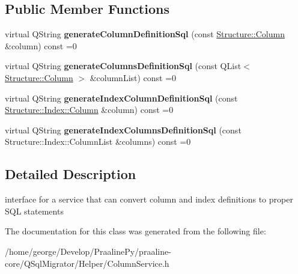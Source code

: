 \subsection*{Public Member Functions}
\begin{DoxyCompactItemize}
\item 
\mbox{\label{class_q_sql_migrator_1_1_helper_1_1_column_service_aa3adb01c524afc209a029a803f9ff177}} 
virtual Q\+String {\bfseries generate\+Column\+Definition\+Sql} (const \hyperlink{class_q_sql_migrator_1_1_structure_1_1_column}{Structure\+::\+Column} \&column) const =0
\item 
\mbox{\label{class_q_sql_migrator_1_1_helper_1_1_column_service_a785bde5004e7a4a4daf909c169b7e27c}} 
virtual Q\+String {\bfseries generate\+Columns\+Definition\+Sql} (const Q\+List$<$ \hyperlink{class_q_sql_migrator_1_1_structure_1_1_column}{Structure\+::\+Column} $>$ \&column\+List) const =0
\item 
\mbox{\label{class_q_sql_migrator_1_1_helper_1_1_column_service_ae6384025ff1f65772b1f249286fd35e8}} 
virtual Q\+String {\bfseries generate\+Index\+Column\+Definition\+Sql} (const \hyperlink{class_q_sql_migrator_1_1_structure_1_1_index_1_1_column}{Structure\+::\+Index\+::\+Column} \&column) const =0
\item 
\mbox{\label{class_q_sql_migrator_1_1_helper_1_1_column_service_add05b75bd7c1bbcd8d7dc54445623ac9}} 
virtual Q\+String {\bfseries generate\+Index\+Columns\+Definition\+Sql} (const Structure\+::\+Index\+::\+Column\+List \&columns) const =0
\end{DoxyCompactItemize}


\subsection{Detailed Description}
interface for a service that can convert column and index definitions to proper S\+QL statements 

The documentation for this class was generated from the following file\+:\begin{DoxyCompactItemize}
\item 
/home/george/\+Develop/\+Praaline\+Py/praaline-\/core/\+Q\+Sql\+Migrator/\+Helper/Column\+Service.\+h\end{DoxyCompactItemize}
